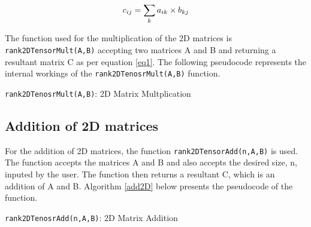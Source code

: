 \documentclass[conference]{IEEEtran}
\begin{document}
\begin{equation}
\centering
	c_{ij} = \sum_{k} a_{ik}\times b_{kj}
    \label{eq1}
\end{equation}

The function used for the multiplication of the 2D matrices is \texttt{rank2DTensorMult(A,B)} accepting two matrices A and B and returning a resultant matrix C as per equation \ref{eq1}. The following pseudocode represents the internal workings of the \texttt{rank2DTenosrMult(A,B)} function.



\linesnumbered
\begin{algorithm}

\centring



\caption{\texttt{rank2DTenosrMult(A,B)}: 2D Matrix Multplication}
\Return \C
\label{mult2d}
\end{algorithm}


\subsection{Addition of 2D matrices}
For the addition of 2D matrices, the function \texttt{rank2DTensorAdd(n,A,B)} is used. The function accepts the matrices A and B and also accepts the desired size, n, inputed by the user. The function then returns a resultant C, which is an addition of A and B. Algorithm \ref{add2D} below presents the pseudocode of the function.



\begin{algorithm}

\centring


\caption{\texttt{rank2DTenosrAdd(n,A,B)}: 2D Matrix Addition}
\Return \C
\label{add2D}
\end{algorithm}
\end{document}
